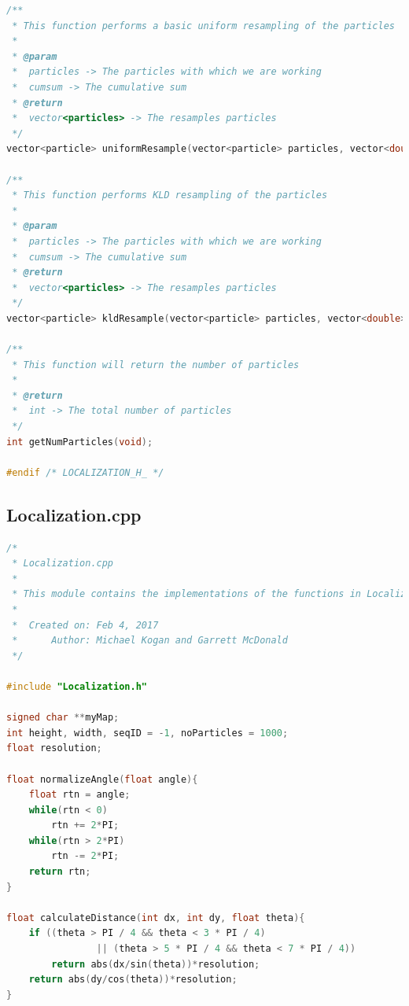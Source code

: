 \documentclass{article}
\begin{document}
\begin{appendices}
\begin{lstlisting}[language=C++]
/**
 * This function performs a basic uniform resampling of the particles
 *
 * @param
 *	particles -> The particles with which we are working
 *	cumsum -> The cumulative sum
 * @return
 *	vector<particles> -> The resamples particles
 */
vector<particle> uniformResample(vector<particle> particles, vector<double> cumsum);

/**
 * This function performs KLD resampling of the particles
 *
 * @param
 *	particles -> The particles with which we are working
 *	cumsum -> The cumulative sum
 * @return
 *	vector<particles> -> The resamples particles
 */
vector<particle> kldResample(vector<particle> particles, vector<double> cumsum);

/**
 * This function will return the number of particles
 *
 * @return
 *	int -> The total number of particles
 */
int getNumParticles(void);

#endif /* LOCALIZATION_H_ */

\end{lstlisting}

\subsection{Localization.cpp}
\begin{lstlisting}[language=C++]
/*
 * Localization.cpp
 *
 * This module contains the implementations of the functions in Localization.h
 *
 *  Created on: Feb 4, 2017
 *      Author: Michael Kogan and Garrett McDonald
 */

#include "Localization.h"

signed char **myMap;
int height, width, seqID = -1, noParticles = 1000;
float resolution;

float normalizeAngle(float angle){
	float rtn = angle;
	while(rtn < 0)
		rtn += 2*PI;
	while(rtn > 2*PI)
		rtn -= 2*PI;
	return rtn;
}

float calculateDistance(int dx, int dy, float theta){
	if ((theta > PI / 4 && theta < 3 * PI / 4)
				|| (theta > 5 * PI / 4 && theta < 7 * PI / 4))
		return abs(dx/sin(theta))*resolution;
	return abs(dy/cos(theta))*resolution;
}


\end{lstlisting}
\end{appendices}
\end{document}
